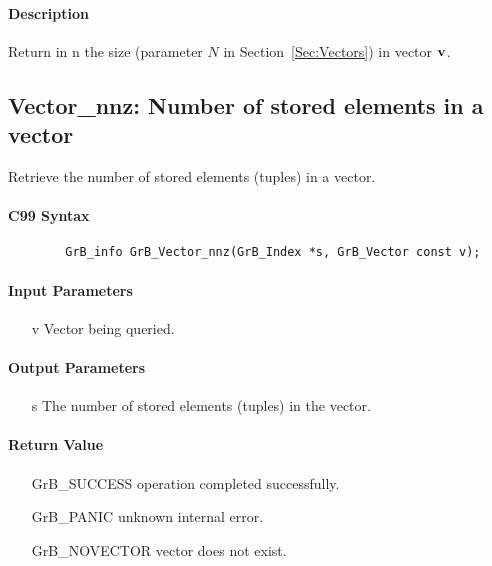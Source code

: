 \paragraph{Description}

Return in {\sf n} the size (parameter $N$ in Section~\ref{Sec:Vectors}) in vector ${\bf v}$.

\subsection{{\sf Vector\_nnz}: Number of stored elements in a vector}

Retrieve the number of stored elements (tuples) in a vector.

\paragraph{C99 Syntax}

\begin{verbatim}
        GrB_info GrB_Vector_nnz(GrB_Index *s, GrB_Vector const v);
\end{verbatim}

\paragraph{Input Parameters}

\begin{itemize}[leftmargin=1.1in]
    \item[{\sf v}] Vector being queried.
\end{itemize}

\paragraph{Output Parameters}
\begin{itemize}[leftmargin=1.1in]
    \item[{\sf s}] The number of stored elements (tuples) in the vector.
\end{itemize}

\paragraph{Return Value}

\begin{itemize}[leftmargin=2.1in]
\item[{\sf GrB\_SUCCESS}]   operation completed successfully.
\item[{\sf GrB\_PANIC}]     unknown internal error.
\item[{\sf GrB\_NOVECTOR}]  vector does not exist.
\end{itemize}

